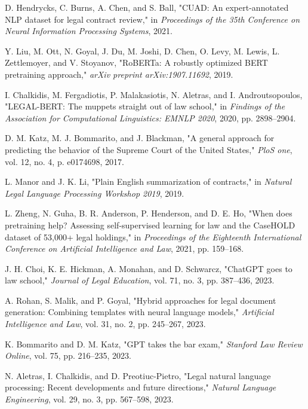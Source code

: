 \documentclass[conference]{IEEEtran}
\begin{document}
\begin{thebibliography}{00}
 D. Hendrycks, C. Burns, A. Chen, and S. Ball, "CUAD: An expert-annotated NLP dataset for legal contract review," in \textit{Proceedings of the 35th Conference on Neural Information Processing Systems}, 2021.

 Y. Liu, M. Ott, N. Goyal, J. Du, M. Joshi, D. Chen, O. Levy, M. Lewis, L. Zettlemoyer, and V. Stoyanov, "RoBERTa: A robustly optimized BERT pretraining approach," \textit{arXiv preprint arXiv:1907.11692}, 2019.

 I. Chalkidis, M. Fergadiotis, P. Malakasiotis, N. Aletras, and I. Androutsopoulos, "LEGAL-BERT: The muppets straight out of law school," in \textit{Findings of the Association for Computational Linguistics: EMNLP 2020}, 2020, pp. 2898--2904.

 D. M. Katz, M. J. Bommarito, and J. Blackman, "A general approach for predicting the behavior of the Supreme Court of the United States," \textit{PloS one}, vol. 12, no. 4, p. e0174698, 2017.

 L. Manor and J. K. Li, "Plain English summarization of contracts," in \textit{Natural Legal Language Processing Workshop 2019}, 2019.

 L. Zheng, N. Guha, B. R. Anderson, P. Henderson, and D. E. Ho, "When does pretraining help? Assessing self-supervised learning for law and the CaseHOLD dataset of 53,000+ legal holdings," in \textit{Proceedings of the Eighteenth International Conference on Artificial Intelligence and Law}, 2021, pp. 159--168.

 J. H. Choi, K. E. Hickman, A. Monahan, and D. Schwarcz, "ChatGPT goes to law school," \textit{Journal of Legal Education}, vol. 71, no. 3, pp. 387--436, 2023.

 A. Rohan, S. Malik, and P. Goyal, "Hybrid approaches for legal document generation: Combining templates with neural language models," \textit{Artificial Intelligence and Law}, vol. 31, no. 2, pp. 245--267, 2023.

 K. Bommarito and D. M. Katz, "GPT takes the bar exam," \textit{Stanford Law Review Online}, vol. 75, pp. 216--235, 2023.

 N. Aletras, I. Chalkidis, and D. Preotiuc-Pietro, "Legal natural language processing: Recent developments and future directions," \textit{Natural Language Engineering}, vol. 29, no. 3, pp. 567--598, 2023.

\end{thebibliography}
\end{document}
